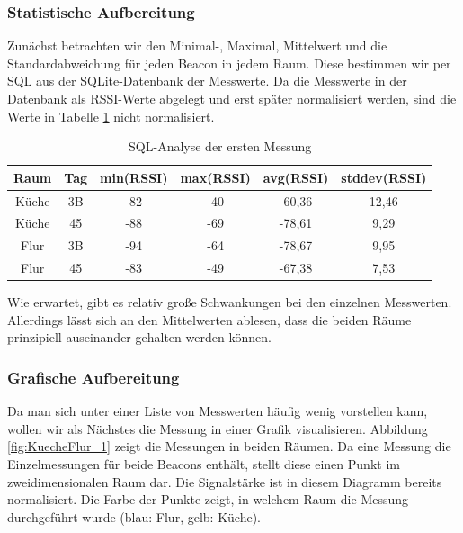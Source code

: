 \subsubsection{Statistische Aufbereitung}

Zunächst betrachten wir den Minimal-, Maximal, Mittelwert und die Standardabweichung für jeden
Beacon in jedem Raum. Diese bestimmen wir per SQL aus der SQLite-Datenbank der Messwerte.
Da die Messwerte in der Datenbank als RSSI-Werte abgelegt und erst später normalisiert werden, sind die Werte in Tabelle \ref{tab:sql-analyze} nicht normalisiert.

\begin{table}[h]
	\caption{SQL-Analyse der ersten Messung}
	\label{tab:sql-analyze}
	\begin{tabular}{|c|c|c|c|c|c|}
		\hline \textbf{Raum} & \textbf{Tag} & \textbf{min(RSSI)} & \textbf{max(RSSI)} & \textbf{avg(RSSI)} & \textbf{stddev(RSSI)} \\
		\hline 
		\hline Küche  & 3B & -82 & -40 & -60,36 & 12,46 \\ 
		\hline Küche & 45 & -88 & -69 & -78,61 & 9,29 \\ 
		\hline Flur & 3B & -94 & -64 & -78,67 & 9,95 \\ 
		\hline Flur & 45 & -83 & -49 & -67,38 & 7,53 \\ 
		\hline 
	\end{tabular}
\end{table}


\vspace{0.4cm}
Wie erwartet, gibt es relativ große Schwankungen bei den einzelnen Messwerten.
Allerdings lässt sich an den Mittelwerten ablesen, dass die beiden Räume
prinzipiell auseinander gehalten werden können.

\subsubsection{Grafische Aufbereitung}
\label{sec:lok-grafische-aufbereitung}

Da man sich unter einer Liste von Messwerten häufig wenig vorstellen kann,
wollen wir als Nächstes die Messung in einer Grafik visualisieren.
Abbildung \ref{fig:KuecheFlur_1} zeigt die Messungen in beiden Räumen.
Da eine Messung die Einzelmessungen für beide Beacons enthält, stellt diese
einen Punkt im zweidimensionalen Raum dar. Die Signalstärke ist in diesem
Diagramm bereits normalisiert. Die Farbe der Punkte zeigt, in welchem Raum
die Messung durchgeführt wurde (blau: Flur, gelb: Küche).

